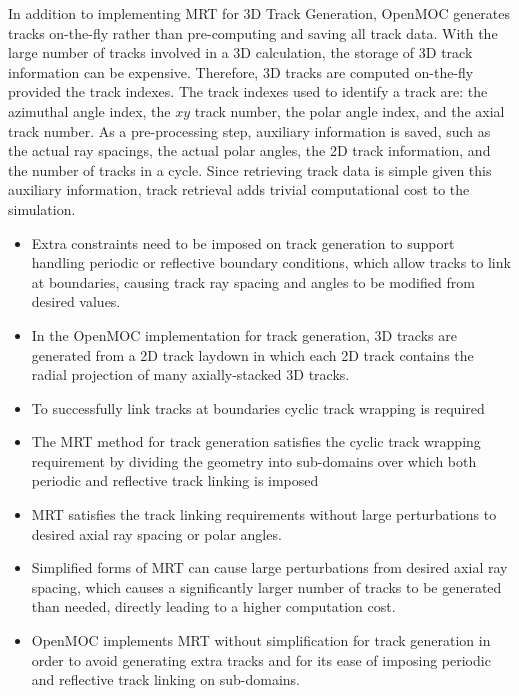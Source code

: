 In addition to implementing \ac{MRT} for 3D Track Generation, OpenMOC generates tracks on-the-fly rather than pre-computing and saving all track data. With the large number of tracks involved in a 3D calculation, the storage of 3D track information can be expensive. Therefore, 3D tracks are computed on-the-fly provided the track indexes. The track indexes used to identify a track are: the azimuthal angle index, the $xy$ track number, the polar angle index, and the axial track number. As a pre-processing step, auxiliary information is saved, such as the actual ray spacings, the actual polar angles, the 2D track information, and the number of tracks in a cycle. Since retrieving track data is simple given this auxiliary information, track retrieval adds trivial computational cost to the simulation.


\clearpage

\vfill
\begin{highlightsbox}[frametitle=Highlights]
\begin{itemize}
  \item Extra constraints need to be imposed on track generation to support handling periodic or reflective boundary conditions, which allow tracks to link at boundaries, causing track ray spacing and angles to be modified from desired values.
  \item In the OpenMOC implementation for track generation, 3D tracks are generated from a 2D track laydown in which each 2D track contains the radial projection of many axially-stacked 3D tracks.
  \item To successfully link tracks at boundaries cyclic track wrapping is required
  \item The \ac{MRT} method for track generation satisfies the cyclic track wrapping requirement by dividing the geometry into sub-domains over which both periodic and reflective track linking is imposed
  \item \ac{MRT} satisfies the track linking requirements without large perturbations to desired axial ray spacing or polar angles.
  \item Simplified forms of \ac{MRT} can cause large perturbations from desired axial ray spacing, which causes a significantly larger number of tracks to be generated than needed, directly leading to a higher computation cost.
  \item OpenMOC implements \ac{MRT} without simplification for track generation in order to avoid generating extra tracks and for its ease of imposing periodic and reflective track linking on sub-domains.
\end{itemize}
\end{highlightsbox}
\vfill